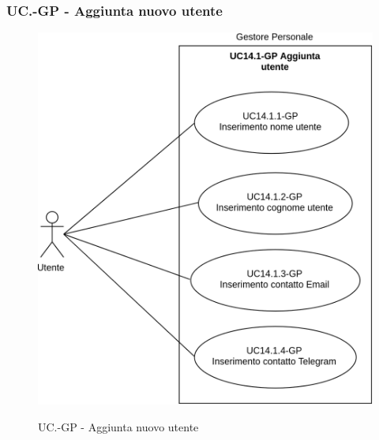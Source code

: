 	\subsubsection{UC\theuccount.\thesubuccount-GP - Aggiunta nuovo utente}
		\begin{figure}[H]
			\centering
			\includegraphics[width=\columnwidth]{img/casi_d'uso/UC14_1.png}\\
			\caption{UC\theuccount.\thesubuccount-GP - Aggiunta nuovo utente}
		\end{figure}
